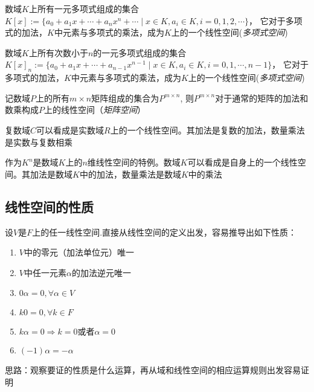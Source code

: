\begin{example}
    数域$K$上所有一元多项式组成的集合$K[x] := \{ a_0 + a_1x + \cdots + a_nx^n + \cdots \mid x \in K, a_i \in K,i = 0,1,2,\cdots \}$，
    它对于多项式的加法，$K$中元素与多项式的乘法，成为$K$上的一个线性空间(\emph{多项式空间})
\end{example}
    
\begin{example}
    数域$K$上所有次数小于$n$的一元多项式组成的集合$K[x]_n:=\{ a_0 + a_1x + \cdots + a_{n-1}x^{n-1} \mid x \in K, a_i \in K,i = 0,1,\cdots, n-1 \}$，
    它对于多项式的加法，$K$中元素与多项式的乘法，成为$K$上的一个线性空间(\emph{多项式空间})
\end{example}
    
\begin{example}
    记数域$P$上的所有$m \times n$矩阵组成的集合为$P^{m \times n}$, 则$P^{m \times n}$对于通常的矩阵的加法和数乘构成$P$上的线性空间（\emph{矩阵空间}）
\end{example}

\begin{example}
    复数域$C$可以看成是实数域$R$上的一个线性空间。其加法是复数的加法，数量乘法是实数与复数相乘
\end{example}

\begin{example}
    作为$K^n$是数域$K$上的$n$维线性空间的特例。数域$K$可以看成是自身上的一个线性空间。其加法是数域$K$中的加法，数量乘法是数域$K$中的乘法
\end{example}

\subsection{线性空间的性质}
设$V$是$F$上的任一线性空间.直接从线性空间的定义出发，容易推导出如下性质：
\begin{enumerate}
    \item $V$中的零元（加法单位元）唯一
    \item $V$中任一元素$\alpha$的加法逆元唯一
    \item $0\alpha = 0, \forall \alpha \in V$
    \item $k0=0, \forall k \in F$
    \item $k\alpha = 0 \Rightarrow k=0 \text{或者} \alpha = 0$
    \item $(-1)\alpha = -\alpha$
\end{enumerate}

\begin{remark}
    思路：观察要证的性质是什么运算，再从域和线性空间的相应运算规则出发容易证明
\end{remark}

